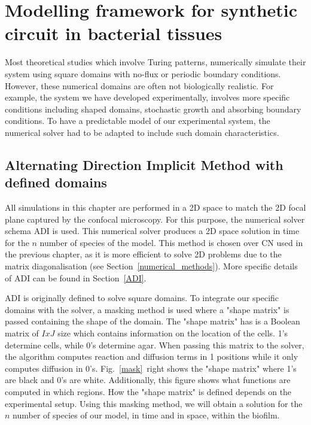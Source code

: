 \section{Modelling framework for synthetic circuit in bacterial tissues}
Most theoretical studies which involve Turing patterns, numerically simulate their system using square domains with no-flux or periodic boundary conditions.
However, these numerical domains are often not biologically realistic.
For example, the system we have developed experimentally, involves more specific conditions including shaped domains, stochastic growth and absorbing boundary conditions.
To have a predictable model of our experimental system, the numerical solver had to be adapted to include such domain characteristics.

\subsection{Alternating Direction Implicit Method with defined domains}\label{Alternating Direction Implicit Method with defined domains}
All simulations in this chapter are performed in a \acrshort{2D} space to match the \acrshort{2D} focal plane captured by the confocal microscopy.
For this purpose, the numerical solver schema  \acrfull{ADI} is used.
This numerical solver produces a 2D space solution in time for the $n$ number of species of the model.
This method is chosen over \acrshort{CN} used in the previous chapter, as it is more efficient to solve 2D problems due to the matrix diagonalisation (see Section~\ref{numerical_methods}). More specific details of ADI can be found in Section~\ref{ADI}.



ADI is originally defined to solve square domains.
To integrate our specific domains with the solver, a masking method is used where a "shape matrix" is passed containing the shape of the domain.
The "shape matrix" has is a Boolean matrix of $IxJ$ size which contains information on the location of the cells.
1's determine cells, while 0's determine agar.
When passing this matrix to the solver, the algorithm computes reaction and diffusion terms in 1 positions while it only computes diffusion in 0's.
Fig.~\ref{mask}~right shows the "shape matrix" where 1's are black and 0's are white.
Additionally, this figure shows what functions are computed in which regions.
How the "shape matrix" is defined depends on the experimental setup.
Using this masking method, we will obtain a solution for the $n$ number of species of our model, in time and in space, within the biofilm.

